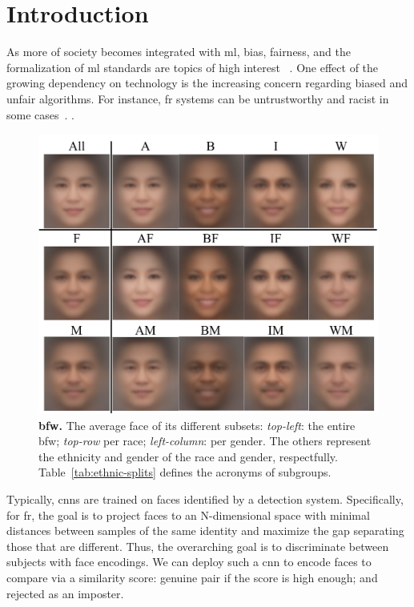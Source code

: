
\glsresetall
\section{Introduction}
As more of society becomes integrated with \gls{ml}, bias, fairness, and the formalization of \gls{ml} standards are topics of high interest ~\cite{10.1007/978-3-030-13469-3_68, anne2018women, wang2018racial}. One effect of the growing dependency on technology is the increasing concern regarding biased and unfair algorithms.  For instance, \gls{fr} systems can be untrustworthy and racist in some cases~\cite{england2019,snow2018}.
. 

\begin{figure}[t!]
\centering
         \includegraphics[trim=0in 0.2in 0in 0in,clip,width=.9\linewidth]{images/montage.pdf}  
\caption{\textbf{\gls{bfw}.} The average face of its different subsets: \emph{top-left}: the entire \gls{bfw}; \emph{top-row} per race;  \emph{left-column}: per gender. The others represent the ethnicity and gender of the race and gender, respectfully. Table~\ref{tab:ethnic-splits} defines the acronyms of subgroups.}
\label{fig:avg-faces}
\end{figure}

Typically, \glspl{cnn} are trained on faces identified by a detection system. Specifically, for \gls{fr}, the goal is to project faces to an N-dimensional space with minimal distances between samples of the same identity and maximize the gap separating those that are different. Thus, the overarching goal is to discriminate between subjects with face encodings. We can deploy such a \gls{cnn} to encode faces to compare via a similarity score: genuine pair if the score is high enough; and rejected as an imposter. 

